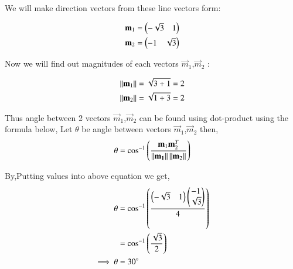 We will make direction vectors from these line vectors form:

\begin{align}
    \mathbf{m}_1 = \begin{pmatrix}-\sqrt{3} & 1\end{pmatrix}\\
    \mathbf{m}_2 = \begin{pmatrix}-1 & \sqrt{3}\end{pmatrix}
\end{align} 


Now we will find out magnitudes of each vectors $\vec{m}_1$,$\vec{m}_2$ :

\begin{align}
    \left\lVert\mathbf{m}_1\right\rVert = \sqrt{3+1} = 2\\
    \left\lVert\mathbf{m}_2\right\rVert = \sqrt{1+3} = 2
\end{align}

Thus angle between 2 vectors $\vec{m}_1$,$\vec{m}_2$ can be found using dot-product using the formula below,
Let $\theta$ be angle between vectors $\vec{m}_1$,$\vec{m}_2$ then,
\begin{align}
    \theta = \cos^{-1}\left({\frac{\mathbf{m}_1\mathbf{m}_2^{T}}{\left\lVert\mathbf{m_1}\right\rVert\left\lVert\mathbf{m}_2\right\rVert}}\right)
\end{align}

By,Putting values into above equation we get,
\begin{align}
    \theta &= \cos^{-1}\left(\frac{\begin{pmatrix}-\sqrt{3}&1\end{pmatrix}\begin{pmatrix}-1 \\ \sqrt{3}\end{pmatrix}}{4}\right) \\
 &= \cos^{-1}\left({\frac{\sqrt{3}}{2}}\right)\\
\implies     \theta &= 30\degree
\end{align}

